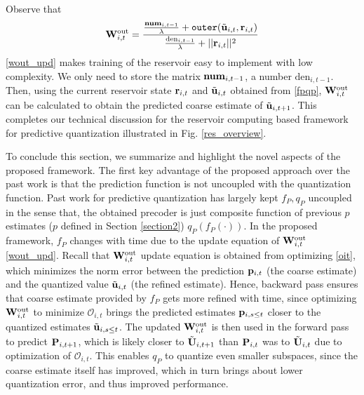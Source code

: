 \documentclass[conference]{IEEEtran}
\begin{document}
Observe that
\begin{equation}
\bW_{i,t}^{\text{out}}=\frac{\frac{\text{\textbf{num}}_{i,t-1}}{\lambda}+\texttt{outer}(\tilde{\bu}_{i,t},\br_{i,t})}{\frac{\text{den}_{i,t-1}}{\lambda}+||\br_{i,t}||^2}
\label{wout_upd}
\end{equation}
\eqref{wout_upd} makes training of the reservoir easy to implement with low complexity.
We only need to store the matrix $\text{\textbf{num}}_{i,t-1}$, a number $\text{den}_{i,t-1}$. Then, using the current reservoir state ${\bf r}_{i,t}$ and $\tilde{{\bf u}}_{i,t}$ obtained from \eqref{fpqp}, ${\bf W}_{i,t}^{\text{out}}$ can be calculated to obtain the predicted coarse estimate of $\tilde{{\bf u}}_{i,t+1}$.
This completes our technical discussion for the reservoir computing based framework for predictive quantization illustrated in Fig. \ref{res_overview}.

To conclude this section, we summarize and highlight the novel aspects of the proposed framework.
The first key advantage of the proposed approach over the past work \cite{Gupt1905:Predictive,6891198,6545375} is that the prediction function is not uncoupled with the quantization function.
Past work for predictive quantization has largely kept $f_P,q_P$ uncoupled in the sense that, the obtained precoder is just composite function of previous $p$ estimates ($p$ defined in Section \ref{section2}) $q_P(f_P(\cdot))$. In the proposed framework, $f_P$ changes with time due to the update equation of ${\bf W}_{i,t}^{\text{out}}$ \eqref{wout_upd}. Recall that ${\bf W}_{i,t}^{\text{out}}$ update equation is obtained from optimizing \eqref{oit}, which minimizes the norm error between the prediction ${\bf p}_{i,t}$ (the coarse estimate) and the quantized value $\tilde{{\bf u}}_{i,t}$ (the refined estimate). Hence, backward pass ensures that coarse estimate provided by $f_P$ gets more refined with time, since optimizing ${\bf W}_{i,t}^{\text{out}}$ to minimize $\mathcal{O}_{i,t}$ brings the predicted estimates ${\bf p}_{i,s\leq t}$ closer to the quantized estimates $\tilde{{\bf u}}_{i,s\leq t}$.
The updated ${\bf W}_{i,t}^{\text{out}}$ is then used in the forward pass to predict ${\bf P}_{i,t+1}$, which is likely closer to $\tilde{{\bf U}}_{i,t+1}$ than ${\bf P}_{i,t}$ was to $\tilde{{\bf U}}_{i,t}$ due to optimization of $\mathcal{O}_{i,t}$.
This enables $q_P$ to quantize even smaller subspaces, since the coarse estimate itself has improved, which in turn brings about lower quantization error, and thus improved performance.
\end{document}
